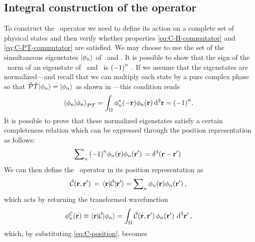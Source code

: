         \subsection{Integral construction of the \texorpdfstring{\hC}{C} operator}
            To construct the \hC\ operator we need to define its action on a complete set of physical states and then verify whether properties \eqref{eq:C-H-commutator} and \eqref{eq:C-PT-commutator} are satisfied. We may choose to use the set of the simultaneous eigenstates $\ket{\phi_n}$ of \hH\ and \hPT. It is possible to show that the sign of the \PT\ norm of an eigenstate of \hH\ and \hPT\ is $\pqty{-1}^n$ \cite{bender2024}. If we assume that the eigenstates are normalized---and recall that we can multiply each state by a pure complex phase so that $\mathcal{\hat{P}}\mathcal{\hat{T}}\!\ket{\phi_n} = \ket{\phi_n}$ as shown in ---this condition reads \cite{Bender2002,bender2024}
            \begin{equation*}
                \braket{\phi_n}{\phi_n}_{\PT} 
                = \int\nolimits_\Omega \phi_n^*\pqty{-\vb{r}} \phi_n\pqty{\vb{r}} \dd[3]{\vb{r}}
                = \pqty{-1}^n
                \myperiod
            \end{equation*}
            It is possible to prove \cite{bender2024,Weigert2003} that these normalized eigenstates satisfy a certain completeness relation which can be expressed through the position representation as follows:
            \begin{equation}
                \sum\nolimits_n \pqty{-1}^n\phi_n\pqty{\vb{r}}\phi_n\pqty*{\vb{r}'} = \delta^3\pqty*{\vb{r}-\vb{r}'}
            \end{equation}
            We can then define the \hC\ operator in its position representation as
            \begin{equation}
                \label{eq:C-position}
                \hC\pqty*{\vb{r},\vb{r}'}
                = \mel{\vb{r}}{\hC}{\vb{r}'}
                = \sum\nolimits_n \phi_n\pqty{\vb{r}}\phi_n\pqty*{\vb{r}'}
                \mycomma
            \end{equation}
            which acts by returning the transformed wavefunction
            \begin{equation*}
                \phi_n^\mcC\pqty{\vb{r}}
                \equiv\! \mel{\vb{r}}{\hC}{\phi_n}
                = \int\nolimits_\Omega \hC\pqty*{\vb{r},\vb{r}'} \phi_n\pqty*{\vb{r}'} \dd[3]{\vb{r}'}
                \mycomma
            \end{equation*}
            which, by substituting \eqref{eq:C-position}, becomes
